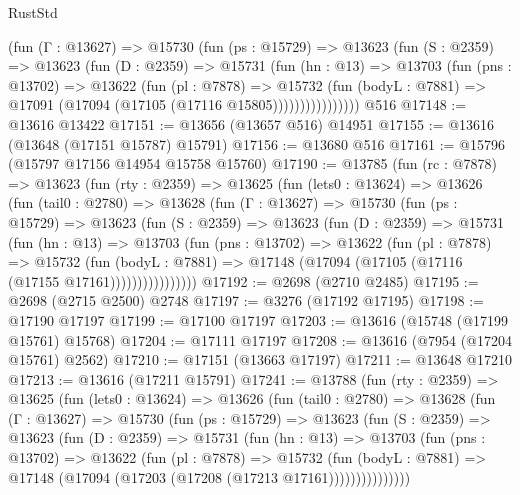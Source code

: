 \begin{lexlean}{RustStd}
\begin{coremodule}
              (fun (Γ : @13627) =>
              @15730
                (fun (ps : @15729) =>
                @13623
                  (fun (S : @2359) =>
                  @13623
                    (fun (D : @2359) =>
                    @15731
                      (fun (hn : @13) =>
                      @13703
                        (fun (pns : @13702) =>
                        @13622
                          (fun (pl : @7878) =>
                          @15732
                            (fun (bodyL : @7881) =>
                            @17091 (@17094 (@17105 (@17116 @15805))))))))))))))))
    @516
@17148 := @13616 @13422
@17151 := @13656 (@13657 @516) @14951
@17155 := @13616 (@13648 (@17151 @15787) @15791)
@17156 := @13680 @516
@17161 := @15796 (@15797 @17156 @14954 @15758 @15760)
@17190 := @13785
    (fun (rc : @7878) =>
    @13623
      (fun (rty : @2359) =>
      @13625
        (fun (lets0 : @13624) =>
        @13626
          (fun (tail0 : @2780) =>
          @13628
            (fun (Γ : @13627) =>
            @15730
              (fun (ps : @15729) =>
              @13623
                (fun (S : @2359) =>
                @13623
                  (fun (D : @2359) =>
                  @15731
                    (fun (hn : @13) =>
                    @13703
                      (fun (pns : @13702) =>
                      @13622
                        (fun (pl : @7878) =>
                        @15732
                          (fun (bodyL : @7881) =>
                          @17148 (@17094 (@17105 (@17116 (@17155 @17161))))))))))))))))
@17192 := @2698 (@2710 @2485)
@17195 := @2698 (@2715 @2500) @2748
@17197 := @3276 (@17192 @17195)
@17198 := @17190 @17197
@17199 := @17100 @17197
@17203 := @13616 (@15748 (@17199 @15761) @15768)
@17204 := @17111 @17197
@17208 := @13616 (@7954 (@17204 @15761) @2562)
@17210 := @17151 (@13663 @17197)
@17211 := @13648 @17210
@17213 := @13616 (@17211 @15791)
@17241 := @13788
    (fun (rty : @2359) =>
    @13625
      (fun (lets0 : @13624) =>
      @13626
        (fun (tail0 : @2780) =>
        @13628
          (fun (Γ : @13627) =>
          @15730
            (fun (ps : @15729) =>
            @13623
              (fun (S : @2359) =>
              @13623
                (fun (D : @2359) =>
                @15731
                  (fun (hn : @13) =>
                  @13703
                    (fun (pns : @13702) =>
                    @13622
                      (fun (pl : @7878) =>
                      @15732
                        (fun (bodyL : @7881) =>
                        @17148 (@17094 (@17203 (@17208 (@17213 @17161)))))))))))))))

\end{coremodule}
\end{lexlean}
